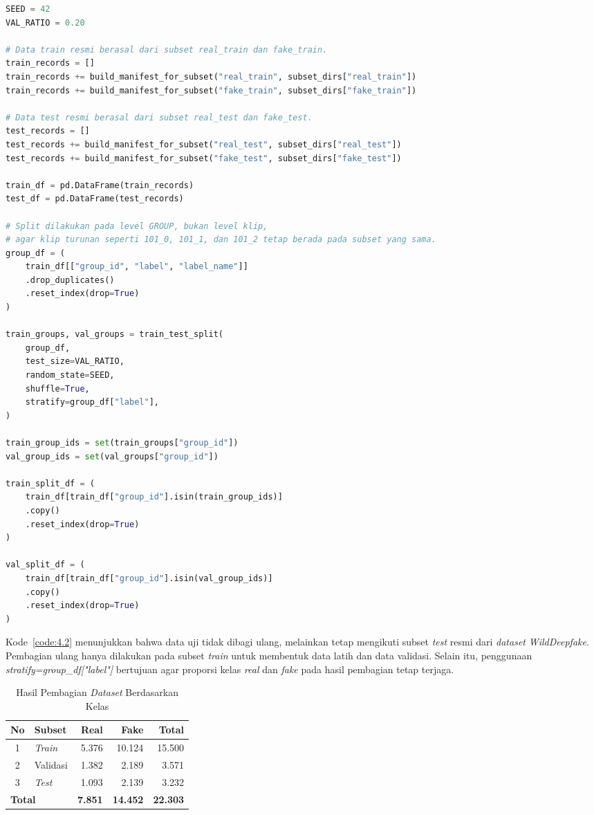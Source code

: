 \begin{lstlisting}[language=Python, caption={Pembagian \textit{Dataset} \textit{Train}, Validasi, dan \textit{Test}}, label={code:4.2}]
SEED = 42
VAL_RATIO = 0.20

# Data train resmi berasal dari subset real_train dan fake_train.
train_records = []
train_records += build_manifest_for_subset("real_train", subset_dirs["real_train"])
train_records += build_manifest_for_subset("fake_train", subset_dirs["fake_train"])

# Data test resmi berasal dari subset real_test dan fake_test.
test_records = []
test_records += build_manifest_for_subset("real_test", subset_dirs["real_test"])
test_records += build_manifest_for_subset("fake_test", subset_dirs["fake_test"])

train_df = pd.DataFrame(train_records)
test_df = pd.DataFrame(test_records)

# Split dilakukan pada level GROUP, bukan level klip,
# agar klip turunan seperti 101_0, 101_1, dan 101_2 tetap berada pada subset yang sama.
group_df = (
	train_df[["group_id", "label", "label_name"]]
	.drop_duplicates()
	.reset_index(drop=True)
)

train_groups, val_groups = train_test_split(
	group_df,
	test_size=VAL_RATIO,
	random_state=SEED,
	shuffle=True,
	stratify=group_df["label"],
)

train_group_ids = set(train_groups["group_id"])
val_group_ids = set(val_groups["group_id"])

train_split_df = (
	train_df[train_df["group_id"].isin(train_group_ids)]
	.copy()
	.reset_index(drop=True)
)

val_split_df = (
	train_df[train_df["group_id"].isin(val_group_ids)]
	.copy()
	.reset_index(drop=True)
)
\end{lstlisting}

Kode~\ref{code:4.2} menunjukkan bahwa data uji tidak dibagi ulang, melainkan tetap mengikuti subset \textit{test} resmi dari \textit{dataset} \textit{WildDeepfake}. Pembagian ulang hanya dilakukan pada subset \textit{train} untuk membentuk data latih dan data validasi. Selain itu, penggunaan \textit{stratify=group\_df["label"]} bertujuan agar proporsi kelas \textit{real} dan \textit{fake} pada hasil pembagian tetap terjaga.

\begin{table}[htbp]
	\centering
	\caption{Hasil Pembagian \textit{Dataset} Berdasarkan Kelas}
	\label{table:4.split}
	\begin{tabular}{clrrr}
		\toprule
		\textbf{No} & \textbf{Subset} & \textbf{Real} & \textbf{Fake} & \textbf{Total} \\
		\midrule
		1 & \textit{Train} & 5.376 & 10.124 & 15.500 \\
		2 & Validasi & 1.382 & 2.189 & 3.571 \\
		3 & \textit{Test} & 1.093 & 2.139 & 3.232 \\
		\midrule
		\multicolumn{2}{l}{\textbf{Total}} & \textbf{7.851} & \textbf{14.452} & \textbf{22.303} \\
		\bottomrule
	\end{tabular}
\end{table}

